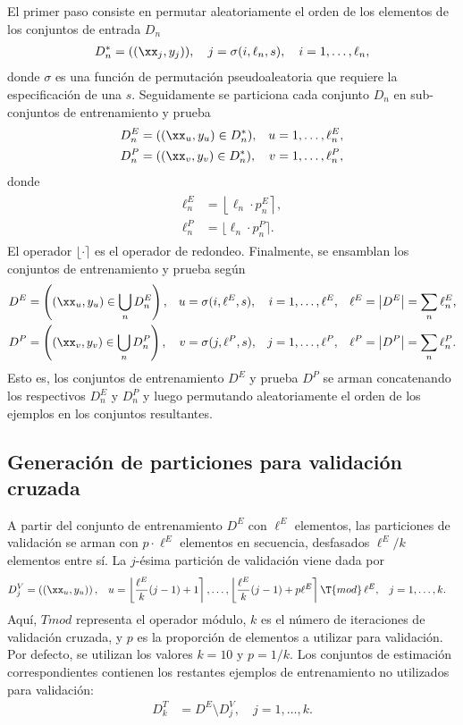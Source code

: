 El primer paso consiste en permutar aleatoriamente el orden de los
elementos de los conjuntos de entrada $D_n$
%
\begin{align}
  D^*_n = ((\xx_j,y_j)), \quad j = \sigma(i,\ell_n,s), \quad i=1,\ldots,\ell_n,
\end{align}
%
donde $\sigma$ es una función de permutación pseudoaleatoria que
requiere la especificación de una  $s$. Seguidamente se
particiona cada conjunto $D_n$ en sub-conjuntos de entrenamiento
y prueba
%
\begin{align}
  D^E_n &= ((\xx_u,y_u)\in D^*_n),& u&=1,\ldots,\ell^E_n, \\
  D^P_n &= ((\xx_v,y_v)\in D^*_n),& v&=1,\ldots,\ell^P_n,
\end{align}
%
donde
%
\begin{align}
  \begin{split}
    \ell^E_n &= \left\lfloor\ell_n\cdot p_n^E \right\rceil, \\
    \ell^P_n &= \lfloor\ell_n\cdot p_n^P\rceil.
  \end{split}
\end{align}
%
El operador $\lfloor\cdot\rceil$ es el operador de redondeo.
Finalmente, se ensamblan los conjuntos de entrenamiento y prueba según
%
\begin{align}
  D^E &= \left( (\xx_u,y_u) \in \bigcup_n {D}^E_n \right), &
  u &= \sigma(i,\ell^E,s), &
  i &= 1,\ldots,\ell^E, &
  \ell^E &= \left| D^E \right| = \sum_n \ell^E_n ,\\
  D^P &= \left( (\xx_v,y_v) \in \bigcup_n {D}^P_n \right), &
  v &= \sigma(j,\ell^P,s), &
  j &= 1,\ldots,\ell^P, &
  \ell^P &= \left| D^P \right| = \sum_n \ell^P_n .
\end{align}
%
Esto es, los conjuntos de entrenamiento $D^E$ y prueba $D^P$ se arman
concatenando los respectivos $D^E_n$ y $D^P_n$ y luego permutando
aleatoriamente el orden de los ejemplos en los conjuntos resultantes.
%
%
\subsection{Generación de particiones para validación cruzada}
%
A partir del conjunto de entrenamiento $D^E$ con $\ell^E$ elementos,
las particiones de validación se arman con $p\cdot\ell^E$ elementos en
secuencia, desfasados $\ell^E/k$ elementos entre sí. La $j$-ésima
partición de validación viene dada por
%
\begin{align}
  D^V_j &= \left((\xx_u,y_u)\right), &
  u &= \left\lfloor\frac{\ell^E}{k}(j-1)+1\right\rceil,\ldots,
       \left\lfloor\frac{\ell^E}{k}(j-1)+p\ell^E\right\rceil\T{mod}\,{\ell^E},&
  j &= 1,\ldots,k.
\end{align}
%
Aquí, $T{mod}$ representa el operador módulo, $k$ es el número de
iteraciones de validación cruzada, y $p$ es la proporción de elementos
a utilizar para validación. Por defecto, se utilizan los valores
$k=10$ y $p=1/k$. Los conjuntos de estimación correspondientes
contienen los restantes ejemplos de entrenamiento no utilizados para
validación:
%
\begin{align}
  D^T_k &= D^E \setminus D^V_j, \quad j=1,\ldots,k.
\end{align}
%
